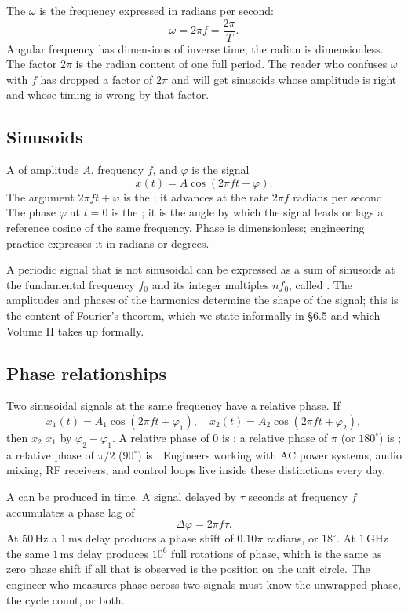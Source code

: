 The  $\omega$ is the frequency expressed
in radians per second:
\[
\omega = 2\pi f = \frac{2\pi}{T}.
\]
Angular frequency has dimensions of inverse time; the radian is
dimensionless. The factor $2\pi$ is the radian content of one full
period. The reader who confuses $\omega$ with $f$ has dropped a
factor of $2\pi$ and will get sinusoids whose amplitude is right
and whose timing is wrong by that factor.

\subsection{Sinusoids}

A  of amplitude $A$, frequency $f$, and
 $\varphi$ is the signal
\[
x(t) = A \cos(2\pi f t + \varphi).
\]
The argument $2\pi f t + \varphi$ is the ; it advances at the rate $2\pi f$ radians per second. The
phase $\varphi$ at $t = 0$ is the ; it is
the angle by which the signal leads or lags a reference cosine of
the same frequency. Phase is dimensionless; engineering practice
expresses it in radians or degrees.

A periodic signal that is not sinusoidal can be expressed as a sum
of sinusoids at the fundamental frequency $f_{0}$ and its integer
multiples $n f_{0}$, called . The amplitudes and
phases of the harmonics determine the shape of the signal; this is
the content of Fourier's theorem, which we state informally in
\S 6.5 and which Volume II takes up formally.

\subsection{Phase relationships}

Two sinusoidal signals at the same frequency have a relative phase.
If
\[
x_{1}(t) = A_{1} \cos(2\pi f t + \varphi_{1}), \quad
x_{2}(t) = A_{2} \cos(2\pi f t + \varphi_{2}),
\]
then $x_{2}$  $x_{1}$ by $\varphi_{2} - \varphi_{1}$.
A relative phase of $0$ is ; a relative phase of
$\pi$ (or $180^{\circ}$) is ; a relative phase
of $\pi/2$ ($90^{\circ}$) is . Engineers
working with AC power systems, audio mixing, RF receivers, and
control loops live inside these distinctions every day.

A  can be produced in time. A signal delayed
by $\tau$ seconds at frequency $f$ accumulates a phase lag of
\[
\Delta \varphi = 2\pi f \tau.
\]
At $50 \,\si{\hertz}$ a $1 \,\si{\milli\second}$ delay produces a
phase shift of $0.10\pi$ radians, or $18^{\circ}$. At $1 \,\si{\giga
\hertz}$ the same $1 \,\si{\milli\second}$ delay produces $10^{6}$
full rotations of phase, which is the same as zero phase shift if
all that is observed is the position on the unit circle. The
engineer who measures phase across two signals must know the
unwrapped phase, the cycle count, or both.

